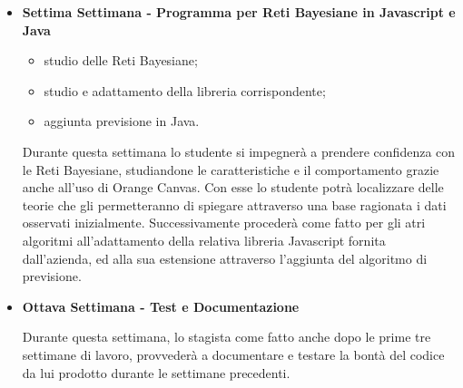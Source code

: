 \begin{itemize}
	\item \textbf{Settima Settimana - Programma per Reti Bayesiane in Javascript e Java}
\begin{itemize}
	\item studio delle Reti Bayesiane;
	\item studio e adattamento della libreria corrispondente;
	\item aggiunta previsione in Java.
	\end{itemize}
	Durante questa settimana lo studente si impegnerà a prendere confidenza con le Reti Bayesiane, studiandone le caratteristiche e il comportamento grazie anche all'uso di Orange Canvas. Con esse lo studente potrà localizzare delle teorie che gli permetteranno di spiegare attraverso una base ragionata i dati osservati inizialmente. Successivamente procederà come fatto per gli atri algoritmi all'adattamento della relativa libreria Javascript fornita dall'azienda, ed alla sua estensione attraverso l'aggiunta del algoritmo di previsione.
	
	\item \textbf{Ottava Settimana - Test e Documentazione}
	 \par Durante questa settimana, lo stagista come fatto anche dopo le prime tre settimane di lavoro, provvederà a documentare e testare la bontà del codice da lui prodotto durante le settimane precedenti.


\end{itemize}